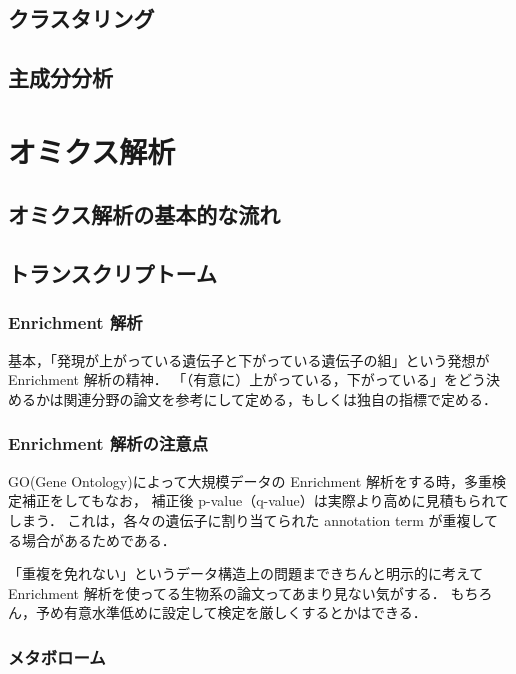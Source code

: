 \section{クラスタリング}
\section{主成分分析}

\chapter{オミクス解析}
\section{オミクス解析の基本的な流れ}
\section{トランスクリプトーム}
\subsection{Enrichment 解析}
基本，「発現が上がっている遺伝子と下がっている遺伝子の組」という発想が Enrichment 解析の精神．
「（有意に）上がっている，下がっている」をどう決めるかは関連分野の論文を参考にして定める，もしくは独自の指標で定める．

\subsection{Enrichment 解析の注意点}

GO(Gene Ontology)によって大規模データの Enrichment 解析をする時，多重検定補正をしてもなお，
補正後 p-value（q-value）は実際より高めに見積もられてしまう．
これは，各々の遺伝子に割り当てられた annotation term が重複してる場合があるためである．

「重複を免れない」というデータ構造上の問題まできちんと明示的に考えて Enrichment 解析を使ってる生物系の論文ってあまり見ない気がする．
もちろん，予め有意水準低めに設定して検定を厳しくするとかはできる．

\subsection{メタボローム}
